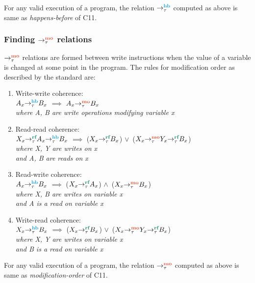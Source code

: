 \begin{lemma} For any valid execution of a program, the relation $\setHB$ computed 
	as above is same as \emph{happens-before} of C11.
\end{lemma}

\subsubsection{Finding $\setMO$ relations}
$\setMO$ relations are formed between write instructions when the value of a 
variable is changed at some point in the program. The rules for modification 
order as described by the standard \cite{C11} are:
\begin{enumerate}
    \item Write-write coherence: \\
    $\hb{\tau}{A_x}{B_x}$ $\implies$ $\mo{\tau}{A_x}{B_x}$\\
    \textit{where A, B are write operations modifying variable x}
    
    \item Read-read coherence:\\
    $\hb{\tau}{\rf{\tau}{X_x}{A_x}}{B_x}$ $\implies$ ($\rf{\tau}{X_x}{B_x}$) $\lor$\ ($\rf{\tau}{\mo{\tau}{X_x}{Y_x}}{B_x}$)\\
    \textit{where X, Y are writes on x\\ and A, B are reads on x}
    
    \item Read-write coherence:\\
    $\hb{\tau}{A_x}{B_x}$ $\implies$ ($\rf{\tau}{X_x}{A_x}$) $\land$\ ($\mo{\tau}{X_x}{B_x}$)\\
    \textit{where X, B are writes on variable x\\and A is a read on variable x}
    
    \item Write-read coherence:\\
    $\hb{\tau}{X_x}{B_x}$ $\implies$ ($\rf{\tau}{X_x}{B_x}$) $\lor$\ ($\rf{\tau}{\mo{\tau}{X_x}{Y_x}}{B_x}$)\\
    \textit{where X, Y are writes on variable x\\and B is a read on variable x}
\end{enumerate}

\begin{lemma}
	For any valid execution of a program, the relation $\setMO$ computed 
	as above is same as \emph{modification-order} of C11.
\end{lemma}

